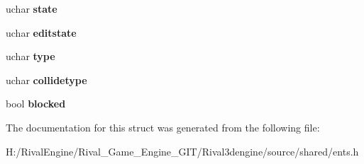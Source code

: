 \begin{DoxyCompactItemize}
\item 
\mbox{\label{structphysent_a8a44b19623b856060dccb39b606a65fc}} 
uchar {\bfseries state}
\item 
\mbox{\label{structphysent_a63ae2d323571ee6236e9f5c0384cfa60}} 
uchar {\bfseries editstate}
\item 
\mbox{\label{structphysent_a5f05656ab22794accdccf288f4056831}} 
uchar {\bfseries type}
\item 
\mbox{\label{structphysent_a9559739316e0d2b54f939194a7259542}} 
uchar {\bfseries collidetype}
\item 
\mbox{\label{structphysent_a2923ea64fc81be5ae30e6623b8fbaf9b}} 
bool {\bfseries blocked}
\end{DoxyCompactItemize}


The documentation for this struct was generated from the following file\+:\begin{DoxyCompactItemize}
\item 
H\+:/\+Rival\+Engine/\+Rival\+\_\+\+Game\+\_\+\+Engine\+\_\+\+G\+I\+T/\+Rival3dengine/source/shared/ents.\+h\end{DoxyCompactItemize}
